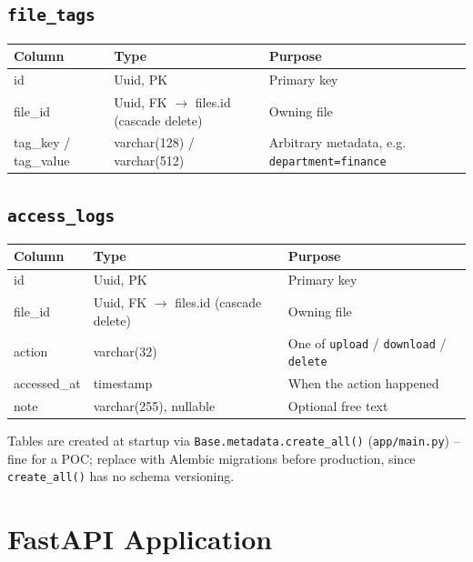 \documentclass[10pt]{article}
\newcommand{\code}[1]{\texttt{\small\color{accentTeal}#1}}
\begin{document}
\subsection{\texttt{file\_tags}}
\noindent \begin{tabularx}{\textwidth}{@{}l l X@{}}
\toprule
\rowcolor{tableHead} \textbf{Column} & \textbf{Type} & \textbf{Purpose} \\
\midrule
id & Uuid, PK & Primary key \\
\rowcolor{tableAlt} file\_id & Uuid, FK $\to$ files.id (cascade delete) & Owning file \\
tag\_key / tag\_value & varchar(128) / varchar(512) & Arbitrary metadata, e.g. \texttt{department=finance} \\
\bottomrule
\end{tabularx}

\subsection{\texttt{access\_logs}}
\noindent \begin{tabularx}{\textwidth}{@{}l l X@{}}
\toprule
\rowcolor{tableHead} \textbf{Column} & \textbf{Type} & \textbf{Purpose} \\
\midrule
id & Uuid, PK & Primary key \\
\rowcolor{tableAlt} file\_id & Uuid, FK $\to$ files.id (cascade delete) & Owning file \\
action & varchar(32) & One of \texttt{upload} / \texttt{download} / \texttt{delete} \\
\rowcolor{tableAlt} accessed\_at & timestamp & When the action happened \\
note & varchar(255), nullable & Optional free text \\
\bottomrule
\end{tabularx}

\begin{tipbox}
Tables are created at startup via \code{Base.metadata.create\_all()}
(\code{app/main.py}) -- fine for a POC; replace with Alembic migrations
before production, since \code{create\_all()} has no schema versioning.
\end{tipbox}

\section{FastAPI Application}
\label{sec:app}
\end{document}
